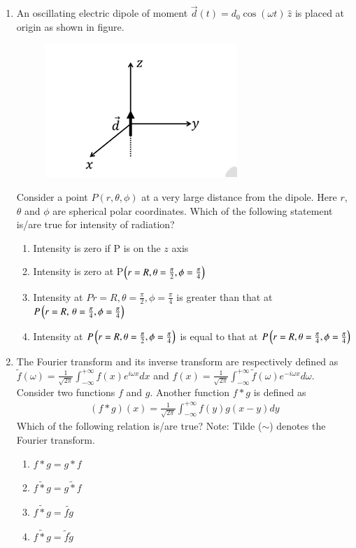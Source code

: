 \documentclass[journal,12pt,onecolumn]{IEEEtran}
\theoremstyle{remark}
\begin{document}
\begin{enumerate}
\item An oscillating electric dipole of moment $\vec{d}(t) = d_0 \cos(\omega t)\,\hat{z}$ is placed at origin as shown in figure.
\begin{figure}[H]   
\centering    
\includegraphics[width = .3\columnwidth]{fig/Q55.png}     \caption*{}  
\label{fig: Q55}
\end{figure} 
Consider a point $P(r, \theta, \phi)$ at a very large distance from the dipole. Here $r$, $\theta$ and $\phi$ are spherical polar coordinates. Which of the following statement is/are true for intensity of radiation?
\begin{enumerate}
    \item Intensity is zero if P is on the $z$ axis
    \item Intensity is zero at P$\left(r = R, \theta = \frac{\pi}{2}, \phi = \frac{\pi}{4}\right)$
    \item Intensity at $Pr = R, \theta = \frac{\pi}{2}, \phi = \frac{\pi}{4}$ is greater than that at $P\left(r = R,\, \theta = \frac{\pi}{4}, \phi = \frac{\pi}{4}\right)$
    \item Intensity at $P\left(r = R, \theta = \frac{\pi}{2}, \phi = \frac{\pi}{4}\right)$ is equal to that at $P\left(r = R, \theta = \frac{\pi}{4}, \phi = \frac{\pi}{4}\right)$
\end{enumerate}

\item The Fourier transform and its inverse transform are respectively defined as
$
\tilde{f}(\omega) = \frac{1}{\sqrt{2\pi}} \int_{-\infty}^{+\infty} f(x) e^{i\omega x} dx
$
and
$
f(x) = \frac{1}{\sqrt{2\pi}} \int_{-\infty}^{+\infty} \tilde{f}(\omega) e^{-i\omega x} d\omega.
$
Consider two functions $f$ and $g$. Another function $f * g$ is defined as
\begin{align*}
(f * g)(x) = \frac{1}{\sqrt{2\pi}} \int_{-\infty}^{+\infty} f(y) g(x - y) dy
\end{align*}
Which of the following relation is/are true?
Note: Tilde ($\sim$) denotes the Fourier transform.
\begin{enumerate}
    \item $f * g = g * f$
    \item $\widetilde{f * g} = \widetilde{g * f}$
    \item $\widetilde{f * g} = \widetilde{fg}$
    \item $\widetilde{f * g} = \tilde{f} \tilde{g}$
\end{enumerate}


\end{enumerate}
\end{document}
